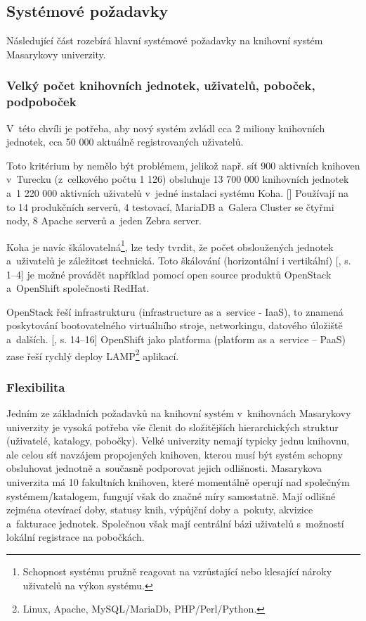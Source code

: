 \documentclass[
	11pt, oneside, printed, final, palatino
	microtype,
	table,   %
	lof,     %
	lot     %
]{fithesis3}
\newcommand{\citepages}[2]{[\cite{#2}, s. #1]}
\newcommand{\citesource}[1]{[\cite{#1}]}
\begin{document}
{\subsection{Systémové požadavky} \label{sec:systemove_pozadavky}
Následující část rozebírá hlavní systémové požadavky na knihovní systém Masarykovy univerzity.

\subsubsection{{\large Velký počet knihovních jednotek, uživatelů, poboček, podpoboček}}
V~této chvíli je potřeba, aby nový systém zvládl cca 2 miliony knihovních jednotek, cca 50 000 aktuálně registrovaných  uživatelů.

Toto kritérium by nemělo být problémem, jelikož např. síť 900 aktivních knihoven v~Turecku (z~celkového počtu 1 126) obsluhuje 13 700 000 knihovních jednotek a~1 220 000 aktivních uživatelů v~jedné instalaci systému Koha. \citesource{koha_komunita_2016}
 Používají na to 14 produkčních serverů, 4 testovací, MariaDB a~Galera Cluster se čtyřmi nody, 8 Apache serverů a~jeden Zebra server. 

Koha je navíc škálovatelná\footnote{Schopnost systému pružně reagovat na vzrůstající nebo klesající nároky uživatelů na výkon systému.}, lze tedy tvrdit, že počet obsloužených jednotek a~uživatelů je záležitost technická. Toto škálování (horizontální i vertikální) \citepages{1–4}{6847479} je možné provádět například pomocí open source produktů OpenStack a~OpenShift společnosti RedHat. 

OpenStack řeší infrastrukturu (infrastructure as a~service - IaaS), to znamená poskytování bootovatelného virtuálního stroje, networkingu, datového úložiště a~dalších. \citepages{14–16}{breeding_2012} OpenShift jako platforma (platform as a~service – PaaS) zase řeší rychlý deploy LAMP\footnote{Linux, Apache, MySQL/MariaDb, PHP/Perl/Python.} aplikací.

\subsubsection{{\large Flexibilita}}
Jedním ze základních požadavků na knihovní systém v~knihovnách Masarykovy univerzity je vysoká potřeba vše členit do složitějších hierarchických struktur (uživatelé, katalogy, pobočky). Velké univerzity nemají typicky jednu knihovnu, ale celou síť navzájem propojených knihoven, kterou musí být systém schopny obsluhovat jednotně a~současně podporovat jejich odlišnosti. Masarykova univerzita má 10 fakultních knihoven, které momentálně operují nad společným systémem/katalogem, fungují však do značné míry samostatně. Mají odlišné zejména otevírací doby, statusy knih, výpůjční doby a~pokuty, akvizice a~fakturace jednotek. Společnou však mají centrální bázi uživatelů s~možností lokální registrace na pobočkách. 

}
\end{document}
